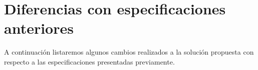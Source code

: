 \documentclass[a4paper, 10pt, twoside]{article}
\begin{document}


\section{Diferencias con especificaciones anteriores}

A continuación listaremos algunos cambios realizados a la solución propuesta con respecto a las especificaciones presentadas previamente.

\end{document}
